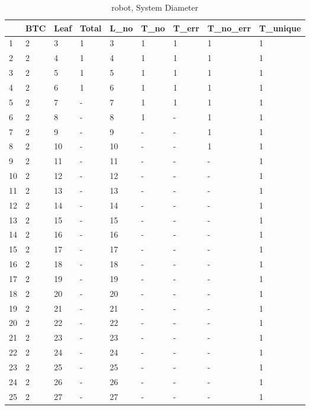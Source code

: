\begin{table}
\centering
\caption{robot, System Diameter}
\label{robot_diam}
\begin{tabular}{lllllllll}
\toprule
{} & BTC & Leaf & Total & L\_no & T\_no & T\_err & T\_no\_err & T\_unique \\
\midrule
1  &   2 &    3 &     1 &    3 &    1 &     1 &        1 &        1 \\
2  &   2 &    4 &     1 &    4 &    1 &     1 &        1 &        1 \\
3  &   2 &    5 &     1 &    5 &    1 &     1 &        1 &        1 \\
4  &   2 &    6 &     1 &    6 &    1 &     1 &        1 &        1 \\
5  &   2 &    7 &     - &    7 &    1 &     1 &        1 &        1 \\
6  &   2 &    8 &     - &    8 &    1 &     - &        1 &        1 \\
7  &   2 &    9 &     - &    9 &    - &     - &        1 &        1 \\
8  &   2 &   10 &     - &   10 &    - &     - &        1 &        1 \\
9  &   2 &   11 &     - &   11 &    - &     - &        - &        1 \\
10 &   2 &   12 &     - &   12 &    - &     - &        - &        1 \\
11 &   2 &   13 &     - &   13 &    - &     - &        - &        1 \\
12 &   2 &   14 &     - &   14 &    - &     - &        - &        1 \\
13 &   2 &   15 &     - &   15 &    - &     - &        - &        1 \\
14 &   2 &   16 &     - &   16 &    - &     - &        - &        1 \\
15 &   2 &   17 &     - &   17 &    - &     - &        - &        1 \\
16 &   2 &   18 &     - &   18 &    - &     - &        - &        1 \\
17 &   2 &   19 &     - &   19 &    - &     - &        - &        1 \\
18 &   2 &   20 &     - &   20 &    - &     - &        - &        1 \\
19 &   2 &   21 &     - &   21 &    - &     - &        - &        1 \\
20 &   2 &   22 &     - &   22 &    - &     - &        - &        1 \\
21 &   2 &   23 &     - &   23 &    - &     - &        - &        1 \\
22 &   2 &   24 &     - &   24 &    - &     - &        - &        1 \\
23 &   2 &   25 &     - &   25 &    - &     - &        - &        1 \\
24 &   2 &   26 &     - &   26 &    - &     - &        - &        1 \\
25 &   2 &   27 &     - &   27 &    - &     - &        - &        1 \\
\bottomrule
\end{tabular}
\end{table}
